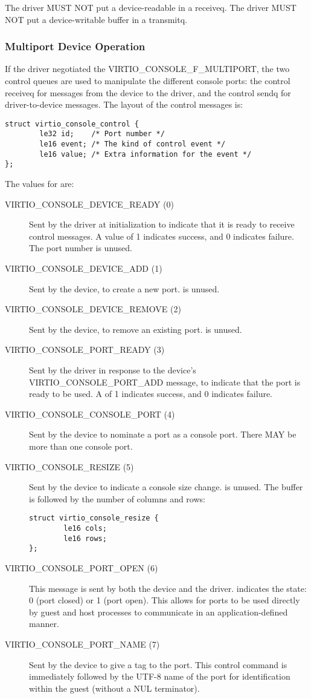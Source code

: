The driver MUST NOT put a device-readable in a receiveq. The driver
MUST NOT put a device-writable buffer in a transmitq.

\subsubsection{Multiport Device Operation}\label{sec:Device Types / Console Device / Device Operation / Multiport Device Operation}

If the driver negotiated the VIRTIO_CONSOLE_F_MULTIPORT, the two
control queues are used to manipulate the different console ports: the
control receiveq for messages from the device to the driver, and the
control sendq for driver-to-device messages.  The layout of the
control messages is:

\begin{lstlisting}
struct virtio_console_control {
        le32 id;    /* Port number */
        le16 event; /* The kind of control event */
        le16 value; /* Extra information for the event */
};
\end{lstlisting}

The values for  are:
\begin{description}
\item [VIRTIO_CONSOLE_DEVICE_READY (0)] Sent by the driver at initialization
  to indicate that it is ready to receive control messages.  A value of
  1 indicates success, and 0 indicates failure.  The port number  is unused.
\item [VIRTIO_CONSOLE_DEVICE_ADD (1)] Sent by the device, to create a new
  port.   is unused.
\item [VIRTIO_CONSOLE_DEVICE_REMOVE (2)] Sent by the device, to remove an
  existing port.  is unused.
\item [VIRTIO_CONSOLE_PORT_READY (3)] Sent by the driver in response
  to the device's VIRTIO_CONSOLE_PORT_ADD message, to indicate that
  the port is ready to be used. A  of 1 indicates success, and 0
  indicates failure.
\item [VIRTIO_CONSOLE_CONSOLE_PORT (4)] Sent by the device to nominate
  a port as a console port.  There MAY be more than one console port.
\item [VIRTIO_CONSOLE_RESIZE (5)] Sent by the device to indicate
  a console size change.   is unused.  The buffer is followed by the number of columns and rows:
\begin{lstlisting}
struct virtio_console_resize {
        le16 cols;
        le16 rows;
};
\end{lstlisting}
\item [VIRTIO_CONSOLE_PORT_OPEN (6)] This message is sent by both the
  device and the driver.   indicates the state: 0 (port
  closed) or 1 (port open).  This allows for ports to be used directly
  by guest and host processes to communicate in an application-defined
  manner.
\item [VIRTIO_CONSOLE_PORT_NAME (7)] Sent by the device to give a tag
  to the port.  This control command is immediately
  followed by the UTF-8 name of the port for identification
  within the guest (without a NUL terminator).
\end{description}

